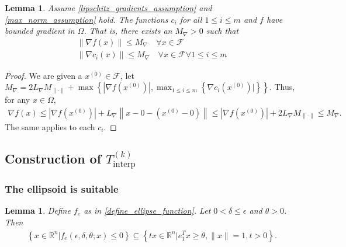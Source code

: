 \documentclass{article}
\newtheorem{lemma}[theorem]{Lemma}
\theoremstyle{case}
\newcommand{\lipgrad}{{L_{\nabla}}}
\newcommand{\maxgrad}{{M_{\nabla}}}
\newcommand{\Rn}{\mathbb R^n}
\newcommand{\sampletrk}{{T_{\text{interp}}^{(k)}}}
\newcommand{\feasible}{{\mathcal F}}
\newcommand{\gradf}{\nabla f}
\newcommand{\maxnorm}{{M_{\|\cdot\|}}}
\begin{document}
\begin{lemma}
\label{bounded_gradients_lemma}
Assume
\cref{lipschitz_gradients_assumption} and \cref{max_norm_assumption} hold.
The functions $c_i$ for all $ 1 \le i \le m$ and $f$ have bounded gradient in $ \Omega $.
That is, there exists an $\maxgrad > 0$ such that
\begin{align}
\|\gradf(x)\| \le \maxgrad \quad  \forall x \in \feasible \\
\|\nabla c_i(x)\| \le \maxgrad \quad  \forall x \in \feasible \forall 1 \le i \le m
\end{align}
\end{lemma}
\begin{proof}
We are given a $x^{(0)} \in \feasible$, let $\maxgrad = 2\lipgrad \maxnorm + \max\left\{|\gradf(x^{(0)})|, \max_{1\le i\le m}\left\{\nabla c_i(x^{(0)})|\right\} \right\}$.
Thus, for any $x \in \Omega$,
\begin{align*}
\gradf(x) \le |\gradf(x^{(0)})| + \lipgrad \left\|x - 0 - (x^{(0)} - 0)\right\| \le |\gradf(x^{(0)})| + 2\lipgrad \maxnorm \le \maxgrad.
\end{align*}
The same applies to each $c_i$.
\end{proof}



\subsection{Construction of $\sampletrk$}
\label{feasible_ellipsoid_analysis}


\subsubsection{The ellipsoid is suitable}

\begin{lemma}
\label{ellipse_in_cone}
Define $f_e$ as in \cref{define_ellipse_function}.
Let $0 < \delta \le \epsilon$ and $\theta > 0$.
Then 
\begin{align*}
\left\{x \in \Rn | f_e(\epsilon, \delta, \theta; x) \le 0\right\} \subseteq \left\{tx\in\Rn| e_1^T x \ge \theta,\|x\|=1, t>0\right\}.
\end{align*}
\end{lemma}
\end{document}
